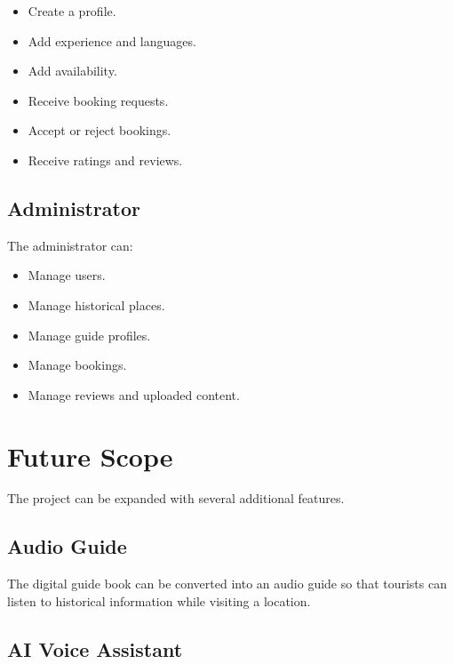 \documentclass[12pt,a4paper]{article}
\begin{document}
\begin{itemize}[leftmargin=*]

    \item Create a profile.
    \item Add experience and languages.
    \item Add availability.
    \item Receive booking requests.
    \item Accept or reject bookings.
    \item Receive ratings and reviews.

\end{itemize}


\subsection{Administrator}

The administrator can:

\begin{itemize}[leftmargin=*]

    \item Manage users.
    \item Manage historical places.
    \item Manage guide profiles.
    \item Manage bookings.
    \item Manage reviews and uploaded content.

\end{itemize}



\section{Future Scope}

The project can be expanded with several additional features.

\subsection{Audio Guide}

The digital guide book can be converted into an audio guide so that
tourists can listen to historical information while visiting a location.


\subsection{AI Voice Assistant}
\end{document}
